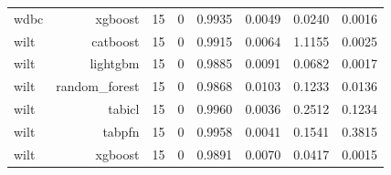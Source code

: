 \begin{table}[htbp]
\begin{tabular}{lrrrrrrr}
wdbc & xgboost & 15 & 0 & 0.9935 & 0.0049 & 0.0240 & 0.0016 \\
wilt & catboost & 15 & 0 & 0.9915 & 0.0064 & 1.1155 & 0.0025 \\
wilt & lightgbm & 15 & 0 & 0.9885 & 0.0091 & 0.0682 & 0.0017 \\
wilt & random\_forest & 15 & 0 & 0.9868 & 0.0103 & 0.1233 & 0.0136 \\
wilt & tabicl & 15 & 0 & 0.9960 & 0.0036 & 0.2512 & 0.1234 \\
wilt & tabpfn & 15 & 0 & 0.9958 & 0.0041 & 0.1541 & 0.3815 \\
wilt & xgboost & 15 & 0 & 0.9891 & 0.0070 & 0.0417 & 0.0015 \\
\hline
\end{tabular}
\end{table}
